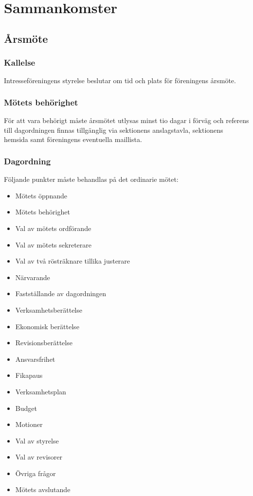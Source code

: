\documentclass[11pt, noincludeaddress]{classes/cthit}
\begin{document}
\section{Sammankomster}

\subsection{Årsmöte}

\subsubsection{Kallelse}
Intresseföreningens styrelse beslutar om tid och plats för föreningens årsmöte. 

\subsubsection{Mötets behörighet}
För att vara behörigt måste årsmötet utlysas minst tio dagar i förväg och referens till dagordningen finnas tillgänglig via sektionens anslagstavla, sektionens hemsida samt föreningens eventuella maillista. 

\subsubsection{Dagordning}
Följande punkter måste behandlas på det ordinarie mötet: 

\begin{itemize}
    \item Mötets öppnande
    \item Mötets behörighet
    \item Val av mötets ordförande
    \item Val av mötets sekreterare
    \item Val av två rösträknare tillika justerare
    \item Närvarande
    \item Fastställande av dagordningen
    \item Verksamhetsberättelse
    \item Ekonomisk berättelse
    \item Revisionsberättelse
    \item Ansvarsfrihet
    \item Fikapaus
    \item Verksamhetsplan
    \item Budget
    \item Motioner
    \item Val av styrelse
    \item Val av revisorer
    \item Övriga frågor
    \item Mötets avslutande
\end{itemize}
\end{document}
